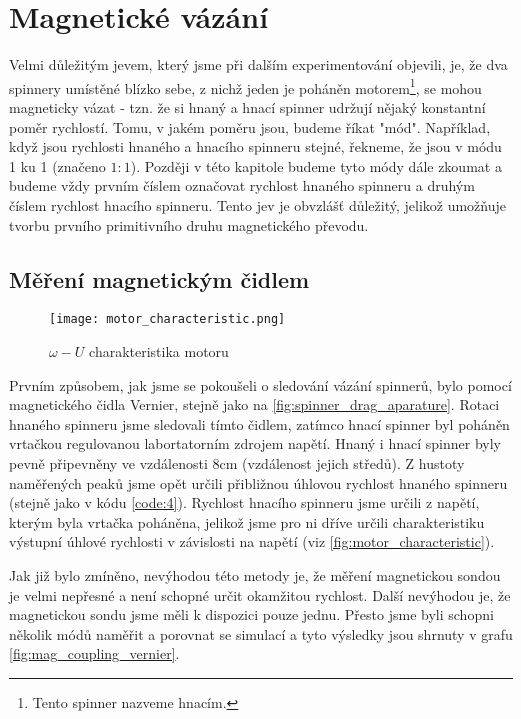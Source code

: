 \chapter{Magnetické vázání}

Velmi důležitým jevem, který jsme při dalším experimentování objevili, je, že dva spinnery umístěné blízko sebe, z nichž jeden je poháněn motorem\footnote{Tento spinner nazveme hnacím.}, se mohou magneticky vázat - tzn. že si hnaný a hnací spinner udržují nějaký konstantní poměr rychlostí.
Tomu, v jakém poměru jsou, budeme říkat "mód". Například, když jsou rychlosti hnaného a hnacího spinneru stejné, řekneme, že jsou v módu 1 ku 1 (značeno $1:1$). Později v této kapitole budeme tyto módy dále zkoumat a budeme vždy prvním číslem označovat rychlost hnaného spinneru a druhým číslem rychlost hnacího spinneru. Tento jev je obvzlášť důležitý, jelikož umožňuje tvorbu prvního primitivního druhu magnetického převodu.

\section{Měření magnetickým čidlem}

\begin{wrapfigure}{r}{0.5\textwidth}
    \texttt{[image: motor\_characteristic.png]}
    \centering
    \caption[$\omega - U$ charakteristika motoru]{$\omega - U$ charakteristika motoru}
    \label{fig:motor_characteristic}
\end{wrapfigure}

Prvním způsobem, jak jsme se pokoušeli o sledování vázání spinnerů, bylo pomocí magnetického čidla Vernier, stejně jako na \autoref{fig:spinner_drag_aparature}. Rotaci hnaného spinneru jsme sledovali tímto čidlem, zatímco hnací spinner byl poháněn vrtačkou regulovanou labortatorním zdrojem napětí. Hnaný i hnací spinner byly pevně připevněny ve vzdálenosti 8cm (vzdálenost jejich středů).
Z hustoty naměřených peaků jsme opět určili přibližnou úhlovou rychlost hnaného spinneru (stejně jako v kódu \ref{code:4}). Rychlost hnacího spinneru jsme určili z napětí, kterým byla vrtačka poháněna, jelikož jsme pro ni dříve určili charakteristiku výstupní úhlové rychlosti v závislosti na napětí (viz \autoref{fig:motor_characteristic}).

Jak již bylo zmíněno, nevýhodou této metody je, že měření magnetickou sondou je velmi nepřesné a není schopné určit okamžitou rychlost. Další nevýhodou je, že magnetickou sondu jsme měli k dispozici pouze jednu. Přesto jsme byli schopni několik módů naměřit a porovnat se simulací a tyto výsledky jsou shrnuty v grafu \ref{fig:mag_coupling_vernier}.

